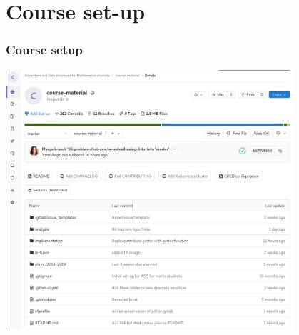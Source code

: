\section{Course set-up}
\label{sec:course_set_up}

\begin{frame}
	\frametitle{Course setup}
	\begin{center}
		\includegraphics[width=0.8\textwidth]{figures/course-setup.png}\
	\end{center}
\end{frame}

